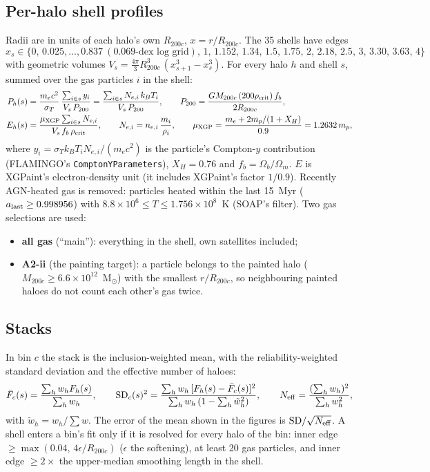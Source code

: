 \documentclass[10pt,a4paper]{article}
\newcommand{\Rc}{R_{200c}}
\begin{document}
\subsection{Per-halo shell profiles}
Radii are in units of each halo's own $\Rc$, $x=r/\Rc$. The 35 shells have edges
\[ x_s\in\{0,\,0.025,\dots,0.837\ (\text{0.069-dex log grid}),\,1,\,1.152,\,1.34,\,1.5,\,1.75,\,2,\,2.18,\,2.5,\,3,\,3.30,\,3.63,\,4\} \]
with geometric volumes $V_s=\tfrac{4\pi}{3}\Rc^3\,(x_{s+1}^3-x_s^3)$. For every halo $h$ and shell $s$, summed over the gas
particles $i$ in the shell:
\begin{align}
P_h(s) &= \frac{m_e c^2}{\sigma_T}\,\frac{\sum_{i\in s} y_i}{V_s\,P_{200}}
        = \frac{\sum_{i\in s} N_{e,i}\,k_B T_i}{V_s\,P_{200}},
\qquad P_{200}=\frac{G M_{200c}\,(200\rho_{\rm crit})\,f_b}{2\Rc}, \label{eq:P}\\
E_h(s) &= \frac{\mu_{\rm XGP}\sum_{i\in s} N_{e,i}}{V_s\,f_b\,\rho_{\rm crit}},
\qquad N_{e,i}=n_{e,i}\,\frac{m_i}{\rho_i},\qquad \mu_{\rm XGP}=\frac{m_e+2m_p/(1+X_H)}{0.9}=1.2632\,m_p, \label{eq:E}
\end{align}
where $y_i=\sigma_T k_B T_i N_{e,i}/(m_e c^2)$ is the particle's Compton-$y$ contribution (FLAMINGO's
\texttt{ComptonYParameters}), $X_H=0.76$ and $f_b=\Omega_b/\Omega_m$. $E$ is XGPaint's electron-density unit (it includes
XGPaint's factor $1/0.9$). Recently AGN-heated gas is removed: particles heated within the last 15~Myr ($a_{\rm last}\ge
0.998956$) with $8.8\times10^6\le T\le1.756\times10^8$~K (SOAP's filter). Two gas selections are used:
\begin{itemize}
\item \textbf{all gas} (``main''): everything in the shell, own satellites included;
\item \textbf{A2-ii} (the painting target): a particle belongs to the painted halo ($M_{200c}\ge6.6\times10^{12}$~M$_\odot$)
  with the smallest $r/\Rc$, so neighbouring painted haloes do not count each other's gas twice.
\end{itemize}

\subsection{Stacks}
In bin $c$ the stack is the inclusion-weighted mean, with the reliability-weighted standard deviation and the effective
number of haloes:
\begin{equation}
\bar F_c(s)=\frac{\sum_h w_h F_h(s)}{\sum_h w_h},\qquad
{\rm SD}_c(s)^2=\frac{\sum_h w_h\,[F_h(s)-\bar F_c(s)]^2}{\sum_h w_h\,(1-\sum_h \tilde w_h^2)},\qquad
N_{\rm eff}=\frac{(\sum_h w_h)^2}{\sum_h w_h^2},
\end{equation}
with $\tilde w_h=w_h/\sum w$. The error of the mean shown in the figures is ${\rm SD}/\sqrt{N_{\rm eff}}$. A shell enters a
bin's fit only if it is resolved for every halo of the bin: inner edge $\ge\max(0.04,\,4\epsilon/\Rc)$ ($\epsilon$ the
softening), at least 20 gas particles, and inner edge $\ge2\times$ the upper-median smoothing length in the shell.
\end{document}
